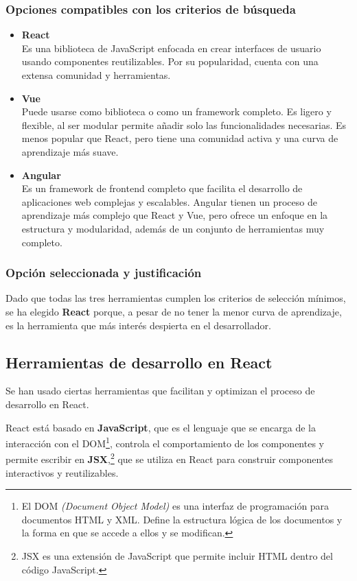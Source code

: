 \subsubsection{Opciones compatibles con los criterios de búsqueda}
\begin{itemize}
    \item \textbf{React}\\
        Es una biblioteca de JavaScript enfocada en crear interfaces de usuario usando componentes reutilizables. Por su popularidad, cuenta con una extensa comunidad y herramientas.
    \item \textbf{Vue}\\
        Puede usarse como biblioteca o como un framework completo. Es ligero y flexible, al ser modular permite añadir solo las funcionalidades necesarias. Es menos popular que React, pero tiene una comunidad activa y una curva de aprendizaje más suave.
    \item \textbf{Angular}\\
        Es un framework de frontend completo que facilita el desarrollo de aplicaciones web complejas y escalables. Angular tienen un proceso de aprendizaje más complejo que React y Vue, pero ofrece un enfoque en la estructura y modularidad, además de un conjunto de herramientas muy completo.
\end{itemize}

\subsubsection{Opción seleccionada y justificación}
Dado que todas las tres herramientas cumplen los criterios de selección mínimos, se ha elegido \textbf{React} porque, a pesar de no tener la menor curva de aprendizaje, es la herramienta que más interés despierta en el desarrollador\cite{banks2020learning}.

\subsection{Herramientas de desarrollo en React}
Se han usado ciertas herramientas que facilitan y optimizan el proceso de desarrollo en React.

React está basado en \textbf{JavaScript}, que es el lenguaje que se encarga de la interacción con el DOM\footnote{ El DOM \textit{(Document Object Model)} es una interfaz de programación para documentos HTML y XML. Define la estructura lógica de los documentos y la forma en que se accede a ellos y se modifican.}, controla el comportamiento de los componentes y permite escribir en \textbf{JSX},\footnote{JSX es una extensión de JavaScript que permite incluir HTML dentro del código JavaScript.} que se utiliza en React para construir componentes interactivos y reutilizables.

